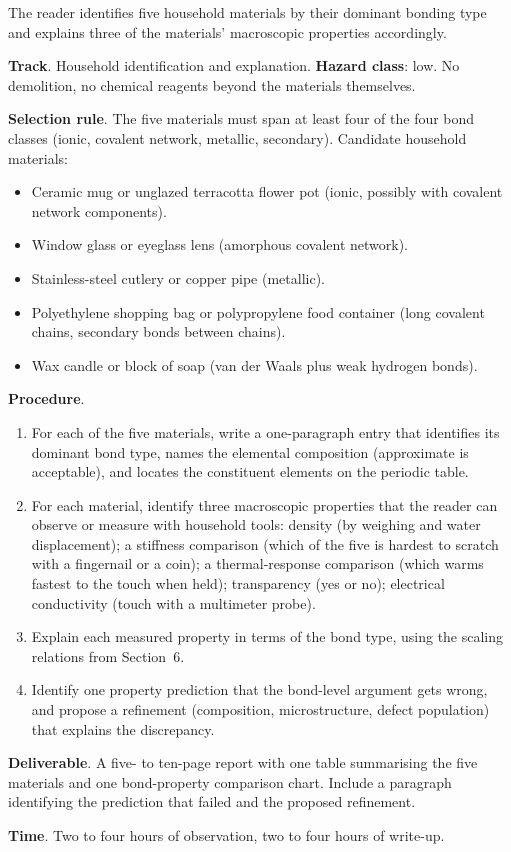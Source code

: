 \begin{project}
The reader identifies five household materials by their dominant
bonding type and explains three of the materials' macroscopic
properties accordingly.

\textbf{Track}. Household identification and explanation.
\textbf{Hazard class}: low. No demolition, no chemical reagents
beyond the materials themselves.

\textbf{Selection rule}. The five materials must span at least four of
the four bond classes (ionic, covalent network, metallic, secondary).
Candidate household materials:

\begin{itemize}[leftmargin=*]
\item Ceramic mug or unglazed terracotta flower pot (ionic, possibly
  with covalent network components).
\item Window glass or eyeglass lens (amorphous covalent network).
\item Stainless-steel cutlery or copper pipe (metallic).
\item Polyethylene shopping bag or polypropylene food container
  (long covalent chains, secondary bonds between chains).
\item Wax candle or block of soap (van der Waals plus weak
  hydrogen bonds).
\end{itemize}

\textbf{Procedure}.

\begin{enumerate}[leftmargin=*]
\item For each of the five materials, write a one-paragraph entry that
  identifies its dominant bond type, names the elemental composition
  (approximate is acceptable), and locates the constituent elements on
  the periodic table.
\item For each material, identify three macroscopic properties that
  the reader can observe or measure with household tools: density (by
  weighing and water displacement); a stiffness comparison (which of
  the five is hardest to scratch with a fingernail or a coin); a
  thermal-response comparison (which warms fastest to the touch when
  held); transparency (yes or no); electrical conductivity (touch
  with a multimeter probe).
\item Explain each measured property in terms of the bond type,
  using the scaling relations from Section~6.
\item Identify one property prediction that the bond-level argument
  gets wrong, and propose a refinement (composition, microstructure,
  defect population) that explains the discrepancy.
\end{enumerate}

\textbf{Deliverable}. A five- to ten-page report with one table
summarising the five materials and one bond-property comparison
chart. Include a paragraph identifying the prediction that failed and
the proposed refinement.

\textbf{Time}. Two to four hours of observation, two to four hours of
write-up.
\end{project}

